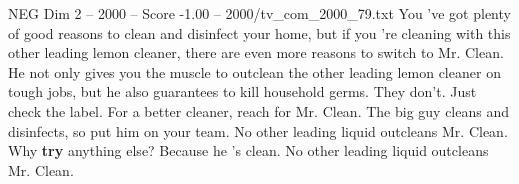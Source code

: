 \begin{textsample}{NEG Dim 2 – 2000 – Score -1.00 – 2000/tv\_com\_2000\_79.txt}  \label{ex:f2_neg_006}
You 've got plenty of good reasons to clean and disinfect your home, but if you 're cleaning with this other leading lemon cleaner, there are even more reasons to switch to Mr.
Clean.
He not only gives you the muscle to outclean the other leading lemon cleaner on tough jobs, but he also guarantees to kill household germs.
They don't.
Just check the label.
For a better cleaner, reach for Mr.
Clean.
The big guy cleans and disinfects, so put him on your team.
No other leading liquid outcleans Mr.
Clean.
Why \textbf{try} anything else?
Because he 's clean.
No other leading liquid outcleans Mr.
Clean.

\end{textsample}
